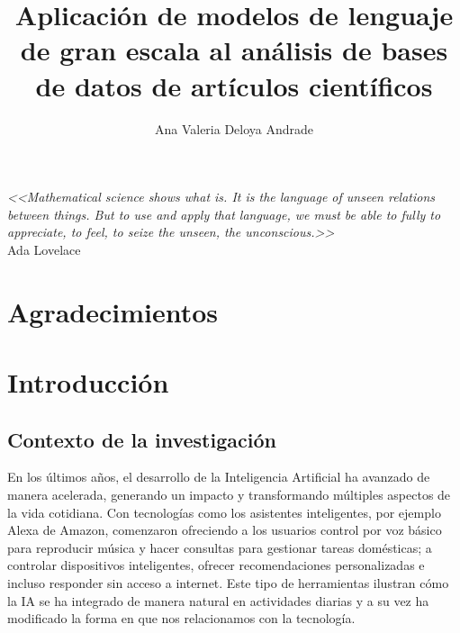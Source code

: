\documentclass[letterpaper,spanish,12pt]{book}
\author{Ana Valeria Deloya Andrade}
\title{Aplicación de modelos de lenguaje de gran escala al análisis de bases de datos de artículos científicos}
\begin{document}
\frontmatter
\maketitle %

\chapter*{}
\vspace{2cm}
\begin{flushright}
	{
	\selectfont\emph{<<Mathematical science shows what is. It is the language of unseen relations between things. But to use and apply that language, we must be able to fully to appreciate, to feel, to seize the unseen, the unconscious.>>}\\
\vspace{5mm}
	Ada Lovelace}

\end{flushright}
\vfill
\chapter{Agradecimientos}

 

\tableofcontents
\mainmatter

\chapter{Introducción}     

    \section{Contexto de la investigación}

    En los últimos años, el desarrollo de la Inteligencia Artificial ha avanzado de manera acelerada, generando un impacto y transformando múltiples aspectos de la vida cotidiana. Con tecnologías como los asistentes inteligentes, por ejemplo Alexa de Amazon, comenzaron ofreciendo a los usuarios control por voz básico para reproducir música y hacer consultas para gestionar tareas domésticas; a controlar dispositivos inteligentes, ofrecer recomendaciones personalizadas e incluso responder sin acceso a internet. Este tipo de herramientas ilustran cómo la IA se ha integrado de manera natural en actividades diarias y a su vez ha modificado la forma en que nos relacionamos con la tecnología. \\
\end{document}
